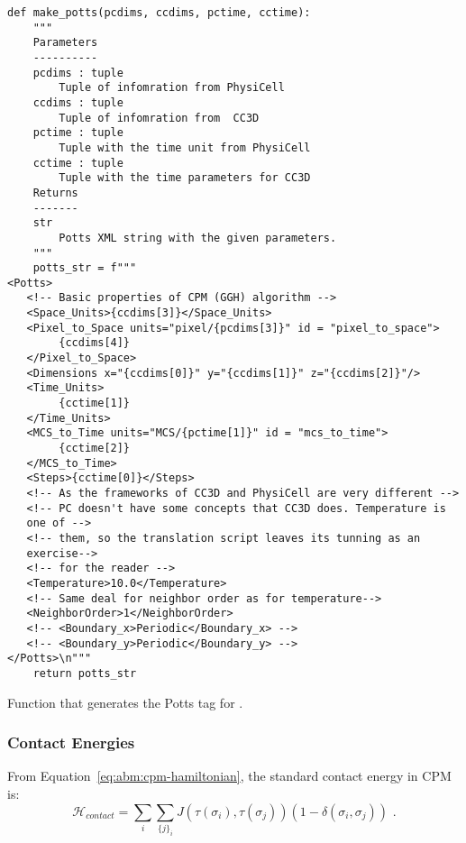 \begin{listing}[H]%
\begin{verbatim}
def make_potts(pcdims, ccdims, pctime, cctime):
    """
    Parameters
    ----------
    pcdims : tuple
        Tuple of infomration from PhysiCell
    ccdims : tuple
        Tuple of infomration from  CC3D
    pctime : tuple
        Tuple with the time unit from PhysiCell
    cctime : tuple
        Tuple with the time parameters for CC3D
    Returns
    -------
    str
        Potts XML string with the given parameters.
    """
    potts_str = f""" 
<Potts>
   <!-- Basic properties of CPM (GGH) algorithm -->
   <Space_Units>{ccdims[3]}</Space_Units>
   <Pixel_to_Space units="pixel/{pcdims[3]}" id = "pixel_to_space">
        {ccdims[4]}
   </Pixel_to_Space>
   <Dimensions x="{ccdims[0]}" y="{ccdims[1]}" z="{ccdims[2]}"/>
   <Time_Units>
        {cctime[1]}
   </Time_Units>
   <MCS_to_Time units="MCS/{pctime[1]}" id = "mcs_to_time">
        {cctime[2]}
   </MCS_to_Time>
   <Steps>{cctime[0]}</Steps>
   <!-- As the frameworks of CC3D and PhysiCell are very different -->
   <!-- PC doesn't have some concepts that CC3D does. Temperature is 
   one of -->
   <!-- them, so the translation script leaves its tunning as an 
   exercise-->
   <!-- for the reader -->
   <Temperature>10.0</Temperature>
   <!-- Same deal for neighbor order as for temperature-->
   <NeighborOrder>1</NeighborOrder>
   <!-- <Boundary_x>Periodic</Boundary_x> -->
   <!-- <Boundary_y>Periodic</Boundary_y> -->
</Potts>\n"""
    return potts_str
\end{verbatim}
\caption{Function that generates the Potts tag for \ccd. }\label{code:trans:cc3d:func-potts}
\end{listing}

\subsubsection{Contact Energies}\label{sec:trans:gen:xml:contact-energy}

From Equation~\ref{eq:abm:cpm-hamiltonian}, the standard contact energy in CPM is:
\begin{equation}\label{eq:trans:cc3d:contact-en}
    \mathcal{H}_{contact} = \sum_{i}\sum_{\{j\}_i} J\left(\tau(\sigma_i), \tau(\sigma_j)\right) \left(1 - \delta(\sigma_i, \sigma_j)\right)\,\,.
\end{equation}

